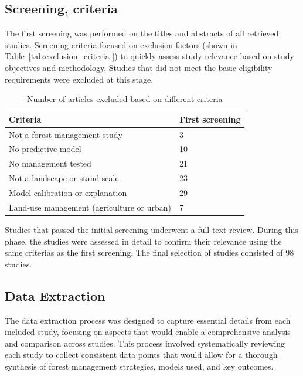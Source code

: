 \documentclass[a4paper,12pt]{article}
\begin{document}
\subsection{Screening, criteria}
\label{sec:screening_criteria}

The first screening was performed on the titles and abstracts of all retrieved studies. Screening criteria focused on exclusion factors (shown in Table~\ref{tab:exclusion_criteria
}) to quickly assess study relevance based on study objectives and methodology. Studies that did not meet the basic eligibility requirements were excluded at this stage.

\begin{table}[h!]
    \centering
    \begin{tabular}{| m{8cm}  m{4cm}|}
    \hline
    Criteria & First screening \\ 
    \hline
    Not a forest management study & 3 \\
    No predictive model & 10 \\ 
    No management tested & 21 \\
    Not a landscape or stand scale & 23 \\ 
    Model calibration or explanation & 29 \\ 
    Land-use management (agriculture or urban) & 7 \\ 
    \hline
    \end{tabular}
    \caption{Number of articles excluded based on different criteria}
    \label{tab:exclusion_criteria}
\end{table}

Studies that passed the initial screening underwent a full-text review. During this phase, the studies were assessed in detail to confirm their relevance using the same criterias as the first screening. The final selection of studies consisted of 98 studies.

\subsection{Data Extraction}
\label{sec:data_extraction}

The data extraction process was designed to capture essential details from each included study, focusing on aspects that would enable a comprehensive analysis and comparison across studies. This process involved systematically reviewing each study to collect consistent data points that would allow for a thorough synthesis of forest management strategies, models used, and key outcomes.
\end{document}
